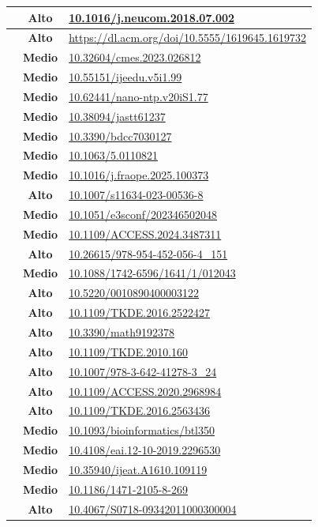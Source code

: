 \begin{longtable}{|c|c|p{9cm}|}
\hline
[19] & \textbf{Alto}  & \url{10.1016/j.neucom.2018.07.002} \\
\hline
[20] & \textbf{Alto}  & \url{https://dl.acm.org/doi/10.5555/1619645.1619732} \\
\hline
[21] & \textbf{Medio} & \url{10.32604/cmes.2023.026812} \\
\hline
[22] & \textbf{Medio} & \url{10.55151/ijeedu.v5i1.99} \\
\hline
[23] & \textbf{Medio} & \url{10.62441/nano-ntp.v20iS1.77} \\
\hline
[24] & \textbf{Medio} & \url{10.38094/jastt61237} \\
\hline
[25] & \textbf{Medio} & \url{10.3390/bdcc7030127} \\
\hline
[26] & \textbf{Medio} & \url{10.1063/5.0110821} \\
\hline
[27] & \textbf{Medio} & \url{10.1016/j.fraope.2025.100373} \\
\hline
[28] & \textbf{Alto}  & \url{10.1007/s11634-023-00536-8} \\
\hline
[29] & \textbf{Medio} & \url{10.1051/e3sconf/202346502048} \\
\hline
[30] & \textbf{Medio} & \url{10.1109/ACCESS.2024.3487311} \\
\hline
[31] & \textbf{Alto}  & \url{10.26615/978-954-452-056-4_151} \\
\hline
[32] & \textbf{Medio} & \url{10.1088/1742-6596/1641/1/012043} \\
\hline
[33] & \textbf{Alto}  & \url{10.5220/0010890400003122} \\
\hline
[34] & \textbf{Alto}  & \url{10.1109/TKDE.2016.2522427} \\
\hline
[35] & \textbf{Alto}  & \url{10.3390/math9192378} \\
\hline
[36] & \textbf{Alto}  & \url{10.1109/TKDE.2010.160} \\
\hline
[37] & \textbf{Alto}  & \url{10.1007/978-3-642-41278-3_24} \\
\hline
[38] & \textbf{Alto}  & \url{10.1109/ACCESS.2020.2968984} \\
\hline
[39] & \textbf{Alto}  & \url{10.1109/TKDE.2016.2563436} \\
\hline
[40] & \textbf{Medio} & \url{10.1093/bioinformatics/btl350} \\
\hline
[41] & \textbf{Medio} & \url{10.4108/eai.12-10-2019.2296530} \\
\hline
[42] & \textbf{Medio} & \url{10.35940/ijeat.A1610.109119} \\
\hline
[43] & \textbf{Medio} & \url{10.1186/1471-2105-8-269} \\
\hline
[44] & \textbf{Alto}  & \url{10.4067/S0718-09342011000300004} \\
\hline

\end{longtable}

